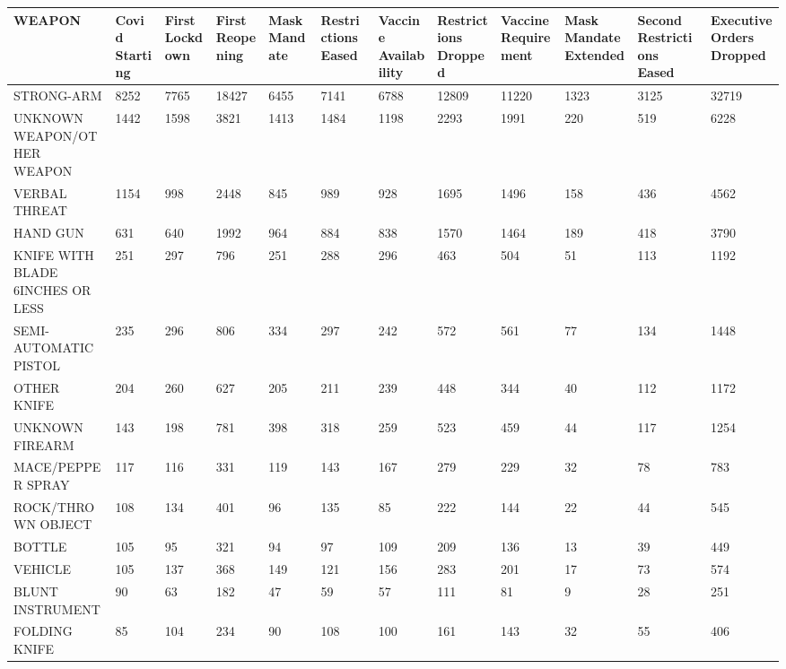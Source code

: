 \documentclass{article}
\begin{document}
\pagestyle{empty}

\begin{landscape}
\begin{table}[!ht]
    \centering
    \small
    \begin{tabular}{|p{2cm}|*{11}{p{1.7cm}|}}
    \hline
        \rowcolor{lightcyan}
        WEAPON & Covid Starting & First Lockdown & First Reopening & Mask Mandate & Restrictions Eased & Vaccine Availability & Restrictions Dropped & Vaccine Requirement & Mask Mandate Extended & Second Restrictions Eased & Executive Orders Dropped \\ \hline
        STRONG-ARM & 8252 & 7765 & 18427 & 6455 & 7141 & 6788 & 12809 & 11220 & 1323 & 3125 & 32719 \\ \hline
        UNKNOWN WEAPON/OTHER WEAPON & 1442 & 1598 & 3821 & 1413 & 1484 & 1198 & 2293 & 1991 & 220 & 519 & 6228 \\ \hline
        VERBAL THREAT & 1154 & 998 & 2448 & 845 & 989 & 928 & 1695 & 1496 & 158 & 436 & 4562 \\ \hline
        HAND GUN & 631 & 640 & 1992 & 964 & 884 & 838 & 1570 & 1464 & 189 & 418 & 3790 \\ \hline
        KNIFE WITH BLADE 6INCHES OR LESS & 251 & 297 & 796 & 251 & 288 & 296 & 463 & 504 & 51 & 113 & 1192 \\ \hline
        SEMI-AUTOMATIC PISTOL & 235 & 296 & 806 & 334 & 297 & 242 & 572 & 561 & 77 & 134 & 1448 \\ \hline
        OTHER KNIFE & 204 & 260 & 627 & 205 & 211 & 239 & 448 & 344 & 40 & 112 & 1172 \\ \hline
        UNKNOWN FIREARM & 143 & 198 & 781 & 398 & 318 & 259 & 523 & 459 & 44 & 117 & 1254 \\ \hline
        MACE/PEPPER SPRAY & 117 & 116 & 331 & 119 & 143 & 167 & 279 & 229 & 32 & 78 & 783 \\ \hline
        ROCK/THROWN OBJECT & 108 & 134 & 401 & 96 & 135 & 85 & 222 & 144 & 22 & 44 & 545 \\ \hline
        BOTTLE & 105 & 95 & 321 & 94 & 97 & 109 & 209 & 136 & 13 & 39 & 449 \\ \hline
        VEHICLE & 105 & 137 & 368 & 149 & 121 & 156 & 283 & 201 & 17 & 73 & 574 \\ \hline
        BLUNT INSTRUMENT & 90 & 63 & 182 & 47 & 59 & 57 & 111 & 81 & 9 & 28 & 251 \\ \hline
        FOLDING KNIFE & 85 & 104 & 234 & 90 & 108 & 100 & 161 & 143 & 32 & 55 & 406 \\ \hline

\end{tabular}
\end{table}
\end{landscape}
\end{document}
